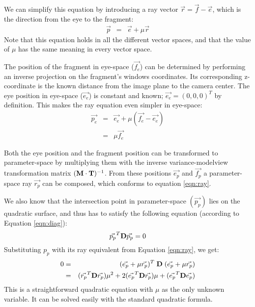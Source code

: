 We can simplify this equation by introducing a ray vector $\vec{r} = \vec{f} - \vec{e}$, which is the direction from the eye to the fragment:
\begin{eqnarray}
\label{eqn:ray}\vec{p} & = & \vec{e} + \mu{\vec{r}}
\end{eqnarray}
Note that this equation holds in all the different vector spaces, and that the value of $\mu$ has the same meaning in every vector space. 

The position of the fragment in eye-space ($\vec{f_e}$) can be determined by performing an inverse projection on the fragment's windows coordinates.
Its corresponding z-coordinate is the known distance from the image plane to the camera center.
The eye position in eye-space ($\vec{e_e}$) is constant and known; $\vec{e_e} = (0,0,0)^T$ by definition. 
This makes the ray equation even simpler in eye-space:
\begin{eqnarray}
\nonumber \vec{p_e} & = & \vec{e_e} + \mu(\vec{f_e} - \vec{e_e})\\
\label{eqn:ray_eye} & = & \mu \vec{f_e}
\end{eqnarray}

Both the eye position and the fragment position can be transformed to parameter-space by multiplying them with the inverse variance-modelview 
transformation matrix $({\bf M \cdot T})^{-1}$. 
From these positions $\vec{e_p}$ and $\vec{f_p}$ a parameter-space ray $\vec{r_p}$ can be composed, which conforms to equation \ref{eqn:ray}.

We also know that the intersection point in parameter-space $(\vec{p_p})$ lies on the quadratic surface, and thus has to satisfy the following equation
(according to Equation \ref{eqn:diag}):
\[
\vec{p_p}^T {\bf D} \vec{p_p} = 0
\]
Substituting $p_p$ with its ray equivalent from Equation \ref{eqn:ray}, we get:
\begin{eqnarray*}
0 & = & (\vec{e_p} + \mu \vec{r_p})^T \; {\bf D} \; (\vec{e_p} + \mu \vec{r_p})\\
 & = & (\vec{r_p}^T {\bf D} \vec{r_p}) \mu^2 + 2 (\vec{e_p}^T {\bf D} \vec{r_p}) \mu + (\vec{e_p}^T {\bf D} \vec{e_p})
\end{eqnarray*}
This is a straightforward quadratic equation with $\mu$ as the only unknown variable. It can be solved easily with the standard quadratic formula.

